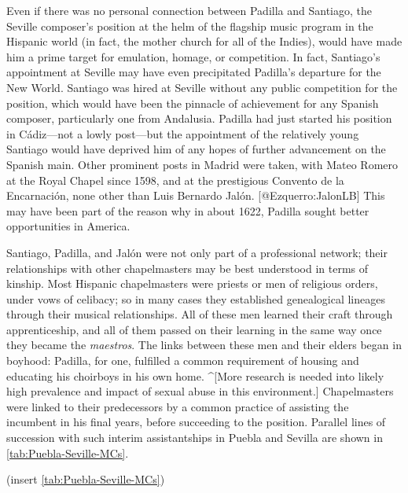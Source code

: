 Even if there was no personal connection between Padilla and Santiago, the
Seville composer's position at the helm of the flagship music program in the
Hispanic world (in fact, the mother church for all of the Indies), would have
made him a prime target for emulation, homage, or competition.
In fact, Santiago's appointment at Seville may have even precipitated Padilla's
departure for the New World.
Santiago was hired at Seville without any public competition for the position,
which would have been the pinnacle of achievement for any Spanish composer,
particularly one from Andalusia.
Padilla had just started his position in Cádiz---not a lowly post---but the
appointment of the relatively young Santiago would have deprived him of any
hopes of further advancement on the Spanish main.
Other prominent posts in Madrid were taken, with Mateo Romero at the Royal Chapel
since 1598, and at the prestigious Convento de la Encarnación, none other than
Luis Bernardo Jalón.
[@Ezquerro:JalonLB] %
This may have been part of the reason why in about 1622, Padilla sought better
opportunities in America.

Santiago, Padilla, and Jalón were not only part of a professional network; their
relationships with other chapelmasters may be best understood in terms of
kinship.
Most Hispanic chapelmasters were priests or men of religious orders, under vows
of celibacy; so in many cases they established genealogical lineages through
their musical relationships.
All of these men learned their craft through apprenticeship, and all of them
passed on their learning in the same way once they became the \emph{maestros}.
The links between these men and their elders began in boyhood: Padilla, for one,
fulfilled a common requirement of housing and educating his choirboys in his own
home.
^[More research is needed into likely high prevalence and impact of sexual abuse
in this environment.]
Chapelmasters were linked to their predecessors by a common practice of
assisting the incumbent in his final years, before succeeding to the position.
Parallel lines of succession with such interim assistantships in Puebla and
Sevilla are shown in \cref{tab:Puebla-Seville-MCs}.

(insert \cref{tab:Puebla-Seville-MCs})
\label{tab:Puebla-Seville-MCs}

